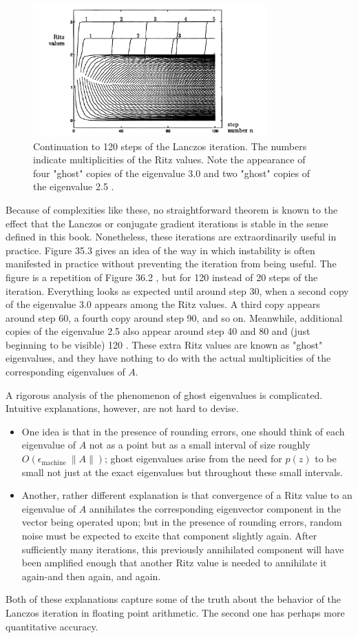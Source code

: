 \begin{figure}[H]
    \centering
    \includegraphics[width=0.8\textwidth]{figures/36-3.png}
    \caption{ Continuation to 120 steps of the Lanczos iteration. The numbers indicate multiplicities of the Ritz values. Note the appearance of four "ghost" copies of the eigenvalue 3.0 and two "ghost" copies of the eigenvalue 2.5 .}
\end{figure}
Because of complexities like these, no straightforward theorem is known to the effect that the Lanczos or conjugate gradient iterations is stable in the sense defined in this book. Nonetheless, these iterations are extraordinarily useful in practice. Figure 35.3 gives an idea of the way in which instability is often manifested in practice without preventing the iteration from being useful. The figure is a repetition of Figure 36.2 , but for 120 instead of 20 steps of the iteration. Everything looks as expected until around step 30, when a second copy of the eigenvalue 3.0 appears among the Ritz values. A third copy appears around step 60, a fourth copy around step 90, and so on. Meanwhile, additional copies of the eigenvalue 2.5 also appear around step 40 and 80 and (just beginning to be visible) 120 . These extra Ritz values are known as "ghost" eigenvalues, and they have nothing to do with the actual multiplicities of the corresponding eigenvalues of $A$.

A rigorous analysis of the phenomenon of ghost eigenvalues is complicated. Intuitive explanations, however, are not hard to devise. 
\begin{itemize}
    \item One idea is that in the presence of rounding errors, one should think of each eigenvalue of $A$ not as a point but as a small interval of size roughly $O\left(\epsilon_{\text {machine }}\|A\|\right)$; ghost eigenvalues arise from the need for $p(z)$ to be small not just at the exact eigenvalues but throughout these small intervals.
    \item Another, rather different explanation is that convergence of a Ritz value to an eigenvalue of $A$ annihilates the corresponding eigenvector component in the vector being operated upon; but in the presence of rounding errors, random noise must be expected to excite that component slightly again. After sufficiently many iterations, this previously annihilated component will have been amplified enough that another Ritz value is needed to annihilate it again-and then again, and again.
\end{itemize} 

Both of these explanations capture some of the truth about the behavior of the Lanczos iteration in floating point arithmetic. The second one has perhaps more quantitative accuracy.